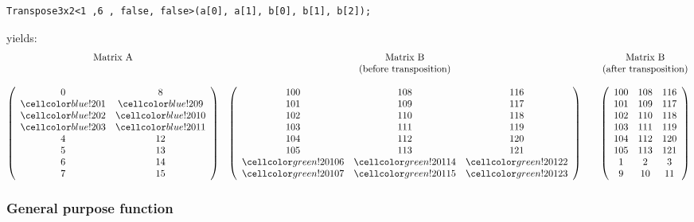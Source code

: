 \vspace{2cm}
\begin{minipage}{\linewidth}
	\begin{verbatim}
Transpose3x2<1 ,6 , false, false>(a[0], a[1], b[0], b[1], b[2]);
	\end{verbatim}
	yields:
	\begin{align*}
	\begin{matrix}
	\textrm{Matrix A} & \textrm{Matrix B}  & & \textrm{Matrix B}\\
	&\textrm{(before transposition)}&&\textrm{(after transposition)}\\
	\\
	\left(\begin{array}{cc}
	0 & 8\\
	\colSrc 1 & \colSrc 9\\
	\colSrc 2 & \colSrc 10\\
	\colSrc 3 & \colSrc 11\\
	4 & 12\\
    5 & 13\\
	6 & 14\\
	7 & 15
	\end{array}\right) 
	&
	\left(\begin{array}{ccc}
	100 & 108 & 116\\
	101 & 109 & 117\\
	102 & 110 & 118\\
	103 & 111 & 119\\
	104 & 112 & 120\\
	105 & 113 & 121\\
	\colTgt 106 & \colTgt 114 & \colTgt 122\\
	\colTgt 107 & \colTgt 115 & \colTgt 123
	\end{array}\right) 
	&&
	\left(\begin{array}{ccc}
    100 & 108 & 116\\
    101 & 109 & 117\\
    102 & 110 & 118\\
    103 & 111 & 119\\
    104 & 112 & 120\\
    105 & 113 & 121\\
    1 & 2 & 3\\
    9 & 10 & 11
\end{array}\right) 
	\end{matrix}
	\end{align*}
\end{minipage}

\subsubsection{General purpose function}

